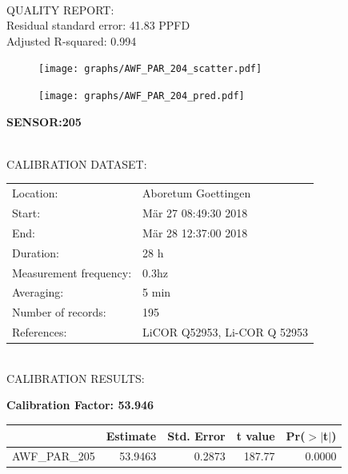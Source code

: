 \documentclass[oneside]{report}
\begin{document}
\hrulefill\\
QUALITY REPORT:\\
Residual standard error: 41.83 PPFD\\
Adjusted R-squared: 0.994



\begin{figure}[H]
  \centering
  \texttt{[image: graphs/AWF\_PAR\_204\_scatter.pdf]}
\end{figure}




\begin{figure}[H]
  \centering
  \texttt{[image: graphs/AWF\_PAR\_204\_pred.pdf]}
\end{figure}

\pagebreak


\begin{center}
\large{\textbf{SENSOR:205}}\\
\end{center}

\hrulefill\\
CALIBRATION DATASET:\\
\begin{table}[h!]
  \centering
  \label{tab:table1}
  \begin{tabular}{ll}
    Location: & Aboretum Goettingen\\ 
    
    
    Start:  & Mär 27 08:49:30 2018 \\
    End:   & Mär 28 12:37:00 2018\\ 
    Duration: & 28 h\\
    Measurement frequency: & 0.3hz\\
    Averaging:  &5 min\\
    Number of records: & 195 \\
    References: & LiCOR Q52953, Li-COR Q 52953 \\
  \end{tabular}
\end{table}

\hrulefill\\
CALIBRATION RESULTS:\\


\begin{center}
\textbf{\large{Calibration Factor: 53.946}}\\
\end{center}
\begin{table}[ht]
\centering
\begin{tabular}{rrrrr}
  \hline
 & Estimate & Std. Error & t value & Pr($>$$|$t$|$) \\ 
  \hline
AWF\_PAR\_205 & 53.9463 & 0.2873 & 187.77 & 0.0000 \\ 
   \hline
\end{tabular}
\end{table}
\end{document}

